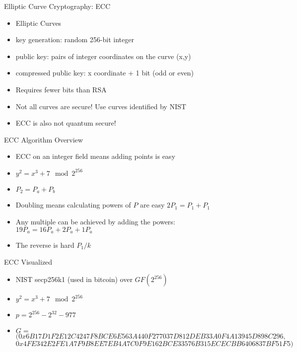 \begin{withoutheadline}
\begin{frame}{Elliptic Curve Cryptography: ECC}
    \begin{itemize}
        \item Elliptic Curves
        \item key generation: random 256-bit integer
        \item public key: pairs of integer coordinates on the curve (x,y)
        \item compressed public key: x coordinate + 1 bit (odd or even)
        \item Requires fewer bits than RSA
        \item Not all curves are secure! Use curves identified by NIST
        \item ECC is also not quantum secure!
    \end{itemize}
\end{frame}

\begin{frame}{ECC Algorithm Overview}
    \begin{itemize}
        \item ECC on an integer field means adding points is easy
        \item $y^2 = x^3 + 7 \mod 2^{256}$
        \item $P_2 = P_a + P_b$ 
        \item Doubling means calculating powers of $P$ are easy $2P_1 = P_1 + P_1$
        \item Any multiple can be achieved by adding the powers: $19P_a = 16P_a + 2P_a + 1P_a$
        \item The reverse is hard $P_1 / k$
    \end{itemize}
\end{frame}

\begin{frame}{ECC Visualized}
    \begin{itemize}
        \item NIST secp256k1 (used in bitcoin) over $GF(2^{256})$
        \item $y^2 = x^3 + 7 \mod 2^{256}$
        \item $p = 2^{256} - 2^{32} - 977$
        \item $G =$
          $( 0x6B17D1F2E12C4247F8BCE6E563A440F277037D812DEB33A0F4A13945D898C296,$ \\
          $  0x4FE342E2FE1A7F9B8EE7EB4A7C0F9E162BCE33576B315ECECBB6406837BF51F5 )$
    \end{itemize}
\end{frame}


\end{withoutheadline}
